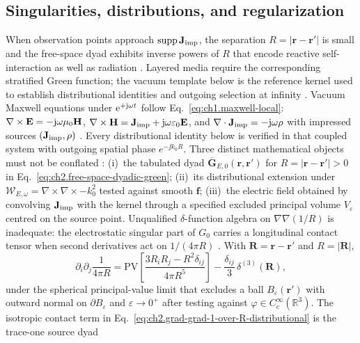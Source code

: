 \subsection{Singularities, distributions, and regularization}
\label{sec:ch232}
When observation points approach $\operatorname{supp}\mathbf{J}_{\mathrm{imp}}$, the separation
$R=|\mathbf{r}-\mathbf{r}'|$ is small and the free-space dyad exhibits inverse powers of $R$
that encode reactive self-interaction as well as radiation \cite{stratton1941}. Layered media
require the corresponding stratified Green function; the vacuum template below is the reference
kernel used to establish distributional identities and outgoing selection at infinity
\cite{collin2001,sommerfeld1949}.
Vacuum Maxwell equations under $\mathrm{e}^{+\mathrm{j}\omega t}$ follow Eq.~\eqref{eq:ch1.maxwell-local}:
$\nabla\times\mathbf{E}=-\mathrm{j}\omega\mu_0\mathbf{H}$, $\nabla\times\mathbf{H}=\mathbf{J}_{\mathrm{imp}}+\mathrm{j}\omega\varepsilon_0\mathbf{E}$, and $\nabla\cdot\mathbf{J}_{\mathrm{imp}}=-\mathrm{j}\omega\rho$
with impressed sources $(\mathbf{J}_{\mathrm{imp}},\rho)$ \cite{stratton1941,jackson1999}. Every distributional identity
below is verified in that coupled system with outgoing spatial phase $e^{-\jj k_0 R}$.
Three distinct mathematical objects must not be conflated \cite{yaghjian1978,tai1994}:
(i)~the tabulated dyad $\overline{\mathbf{G}}_{E,0}(\mathbf{r},\mathbf{r}')$ for $R=|\mathbf{r}-\mathbf{r}'|>0$ in Eq.~\eqref{eq:ch2.free-space-dyadic-green};
(ii)~its distributional extension under $\mathcal{W}_{E,\omega}=\nabla\times\nabla\times-k_0^2$ tested against smooth $\mathbf{f}$;
(iii)~the electric field obtained by convolving $\mathbf{J}_{\mathrm{imp}}$ with the kernel through a specified excluded principal volume $V_\varepsilon$ centred on the source point.
Unqualified $\delta$-function algebra on $\nabla\nabla(1/R)$ is inadequate: the electrostatic singular part of $G_0$ carries a longitudinal contact tensor when second derivatives act on $1/(4\pi R)$ \cite{yaghjian1978,yaghjian1980source}.
With $\mathbf{R}=\mathbf{r}-\mathbf{r}'$ and $R=|\mathbf{R}|$,
\begin{equation}
\label{eq:ch2.grad-grad-1-over-R-distributional}
\partial_i\partial_j\frac{1}{4\pi R}
=
\mathrm{PV}\!\left[\frac{3R_iR_j-R^2\delta_{ij}}{4\pi R^{5}}\right]
-\frac{\delta_{ij}}{3}\,\delta^{(3)}(\mathbf{R}),
\end{equation}
under the spherical principal-value limit that excludes a ball $B_\varepsilon(\mathbf{r}')$ with outward normal on $\partial B_\varepsilon$
and $\varepsilon\to 0^{+}$ after testing against $\varphi\in C_c^{\infty}(\mathbb{R}^{3})$.
The isotropic contact term in Eq.~\eqref{eq:ch2.grad-grad-1-over-R-distributional} is the trace-one source dyad
